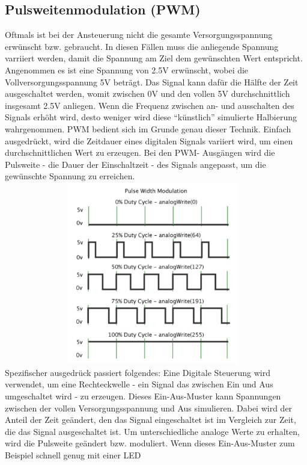\subsection{Pulsweitenmodulation (PWM)}\label{PWM}
Oftmals ist bei der Ansteuerung nicht die gesamte Versorgungsspannung erwünscht bzw. gebraucht. In diesen Fällen muss
die anliegende Spannung varriiert werden, damit die Spannung am Ziel dem gewünschten Wert entspricht.
Angenommen es ist eine Spannung von 2.5V erwünscht, wobei die Vollversorgungsspannung 5V beträgt. Das Signal kann
dafür die Hälfte der Zeit ausgeschaltet werden, womit zwischen 0V und den vollen 5V durchschnittlich insgesamt 2.5V
anliegen. Wenn die Frequenz zwischen an- und ausschalten des Signals erhöht wird, desto weniger wird diese ``künstlich''
simulierte Halbierung wahrgenommen. \newline
PWM bedient sich im Grunde genau dieser Technik.
Einfach ausgedrückt, wird die Zeitdauer eines digitalen Signals variiert wird, um einen
durchschnittlichen Wert zu erzeugen. Bei den PWM- Ausgängen wird die Pulsweite - die Dauer der Einschaltzeit -
des Signals angepasst, um die gewünschte Spannung zu erreichen. \newline
\includegraphics [width=13cm, height=8cm] {img/pulsweite} \newline \newline
Spezifischer ausgedrück passiert folgendes:
Eine Digitale Steuerung wird verwendet, um eine Rechteckwelle - ein Signal das zwischen Ein und Aus umgeschaltet wird
- zu erzeugen. Dieses Ein-Aus-Muster kann Spannungen zwischen der vollen Versorgungsspannung und Aus
simulieren.
Dabei wird der Anteil der Zeit geändert, den das Signal eingeschaltet ist im Vergleich zur Zeit, die das Signal
ausgeschaltet ist. Um unterschiedliche analoge Werte zu
erhalten, wird die Pulsweite geändert bzw. moduliert. Wenn dieses Ein-Aus-Muster zum Beispiel schnell genug mit einer LED
